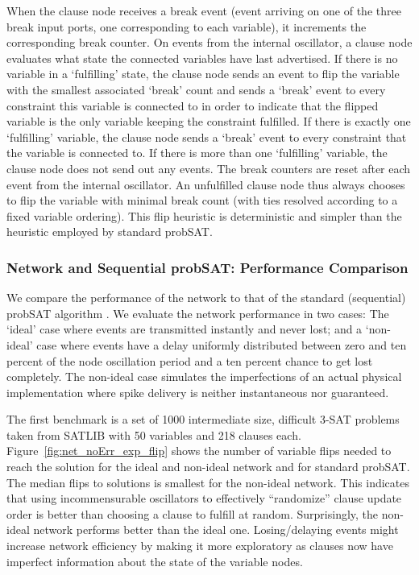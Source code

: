 \documentclass[10pt]{article}
\begin{document}
When the clause node receives a break event (event arriving on one of the three break input ports, one corresponding to each variable), it increments the corresponding break counter. On events from the internal oscillator, a clause node evaluates what state the connected variables have last advertised. If there is no variable in a `fulfilling' state, the clause node sends an  event to flip the variable with the smallest associated `break' count  and sends a `break' event to every constraint this variable is connected to in order to indicate that the flipped variable is the only variable keeping the constraint fulfilled. If there is exactly one `fulfilling' variable, the clause node sends a `break' event to every constraint that the variable is connected to. If there is more than one `fulfilling' variable, the clause node does not send out any events. The break counters are reset after each event from the internal oscillator.  
An unfulfilled clause node thus always chooses to flip the variable with minimal break count (with ties resolved according to a fixed variable ordering). This flip heuristic is deterministic and simpler than the heuristic employed by standard probSAT.

\subsubsection*{Network and Sequential probSAT: Performance Comparison}
We compare the performance of the network to that of the standard (sequential) probSAT algorithm \cite{Balint_Schoning12}. We evaluate the network performance in two cases: The `ideal' case where events are transmitted instantly and never lost; and a `non-ideal' case where events have a delay uniformly distributed between zero and ten percent of the node oscillation period and a ten percent chance to get lost completely. The non-ideal case simulates the imperfections of an actual physical implementation where spike delivery is neither instantaneous nor guaranteed.

The first benchmark is a set of 1000 intermediate size, difficult 3-SAT problems taken from SATLIB \cite{Hoos_Stutzle98} with 50 variables and 218 clauses each. Figure~\ref{fig:net_noErr_exp_flip} shows the number of variable flips needed to reach the solution for the ideal and non-ideal network and for standard probSAT. The median flips to solutions is smallest for the non-ideal network. 
This indicates that using incommensurable oscillators to effectively ``randomize'' clause update order is better than choosing a clause to fulfill at random. 
Surprisingly, the non-ideal network performs better than the ideal one. Losing/delaying events might increase network efficiency by making it more exploratory as clauses now have imperfect information about the state of the variable nodes.
\end{document}
